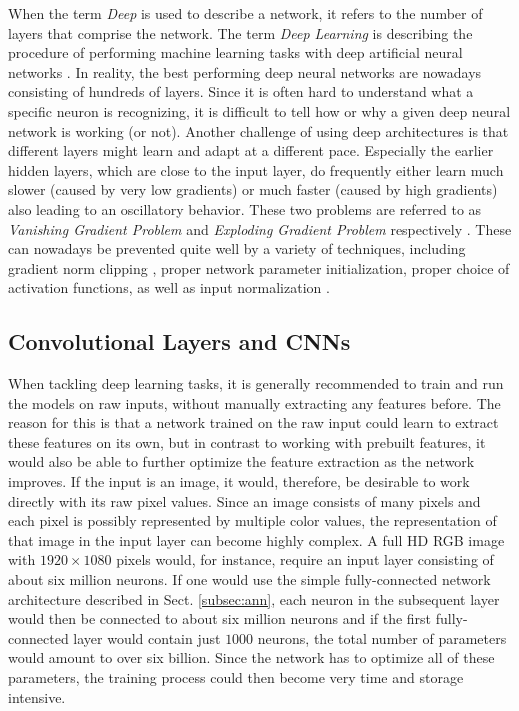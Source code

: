 \documentclass[conference]{IEEEtran}
\begin{document}
When the term \emph{Deep} is used to describe a network, it refers to the number of layers that comprise the network. The term \emph{Deep Learning} is describing the procedure of performing machine learning tasks with deep artificial neural networks \cite{DLbook}. In reality, the best performing deep neural networks are nowadays consisting of hundreds of layers. Since it is often hard to understand what a specific neuron is recognizing, it is difficult to tell how or why a given deep neural network is working (or not). Another challenge of using deep architectures is that different layers might learn and adapt at a different pace. Especially the earlier hidden layers, which are close to the input layer, do frequently either learn much slower (caused by very low gradients) or much faster (caused by high gradients) also leading to an oscillatory behavior. These two problems are referred to as \emph{Vanishing Gradient Problem} and \emph{Exploding Gradient Problem} respectively \cite{NNDLbook}. These can nowadays be prevented quite well by a variety of techniques, including gradient norm clipping \cite{pascanu2012understanding},  proper network parameter initialization, proper choice of activation functions, as well as input normalization \cite{hochreiter1998vanishing,pascanu2013difficulty}.


\subsection{Convolutional Layers and CNNs}\label{subsec:cnn}

When tackling deep learning tasks, it is generally recommended to train and run the models on raw inputs, without manually extracting any features before. The reason for this is that a network trained on the raw input could learn to extract these features on its own, but in contrast to working with prebuilt features, it would also be able to further optimize the feature extraction as the network improves. If the input is an image, it would, therefore, be desirable to work directly with its raw pixel values. Since an image consists of many pixels and each pixel is possibly represented by multiple color values, the representation of that image in the input layer can become highly complex. A full HD RGB image with $1920\times1080$ pixels would, for instance, require an input layer consisting of about six million neurons. If one would use the simple fully-connected network architecture described in Sect. \ref{subsec:ann}, each neuron in the subsequent layer would then be connected to about six million neurons and if the first fully-connected layer would contain just $1000$ neurons, the total number of parameters would amount to over six billion. Since the network has to optimize all of these parameters, the training process could then become very time and storage intensive. 
\end{document}
